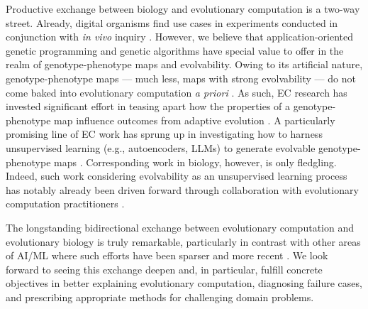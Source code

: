 Productive exchange between biology and evolutionary computation is a two-way street.
Already, digital organisms find use cases in experiments conducted in conjunction with \textit{in vivo} inquiry \citep{sanjun2007selection,wilke2001evolution,hindr2012new}.
However, we believe that application-oriented genetic programming and genetic algorithms have special value to offer in the realm of genotype-phenotype maps and evolvability.
Owing to its artificial nature, genotype-phenotype maps --- much less, maps with strong evolvability --- do not come baked into evolutionary computation \textit{a priori} \citep{kirschner1998evolvability}.
As such, EC research has invested significant effort in teasing apart how the properties of a genotype-phenotype map influence outcomes from adaptive evolution \citep{banzhaf1994genotype,hu2010evolvability,whigham2017mapping}.
A particularly promising line of EC work has sprung up in investigating how to harness unsupervised learning (e.g., autoencoders, LLMs) to generate evolvable genotype-phenotype maps \citep{lehman2023evolution,moreno2018learning,bentley2022evolving,gaier2020discovering,wittenberg2023denoising}.
Corresponding work in biology, however, is only fledgling.
Indeed, such work considering evolvability as an unsupervised learning process has notably already been driven forward through collaboration with evolutionary computation practitioners \citep{kouvaris2017evolution,szilagyi2020phenotypes}.

The longstanding bidirectional exchange between evolutionary computation and evolutionary biology is truly remarkable, particularly in contrast with other areas of AI/ML where such efforts have been sparser and more recent \citep{marblestone2016toward,richards2019deep}.
We look forward to seeing this exchange deepen and, in particular, fulfill concrete objectives in better explaining evolutionary computation, diagnosing failure cases, and prescribing appropriate methods for challenging domain problems.
